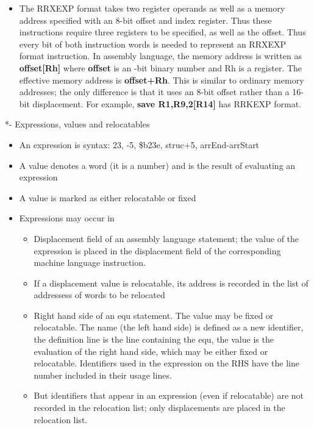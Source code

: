 \documentclass[11pt]{article}
\begin{document}
\begin{itemize}
\item The RRXEXP format takes two register operands as well as a memory
address specified with an 8-bit offset and index register.  Thus
these instructions require three registers to be specified, as well
as the offset.  Thus every bit of both instruction words is needed
to represent an RRXEXP format instruction.  In assembly language,
the memory address is written as \textbf{offset[Rh]} where \textbf{offset} is an
-bit binary number and Rh is a register.  The effective memory
address is \textbf{offset+Rh}. This is similar to ordinary memory
addresses; the only difference is that it uses an 8-bit offset
rather than a 16-bit displacement. For example, \textbf{save R1,R9,2[R14]}
has RRKEXP format.
\end{itemize}

*- Expressions, values and relocatables

\begin{itemize}
\item An expression is syntax: 23, -5, \$b23e, struc+5, arrEnd-arrStart
\item A value denotes a word (it is a number) and is the result of
evaluating an expression
\item A value is marked as either relocatable or fixed
\item Expressions may occur in
\begin{itemize}
\item Displacement field of an assembly language statement; the value of
the expression is placed in the displacement field of the
corresponding machine language instruction.
\item If a displacement value is relocatable, its address is recorded in
the list of addressess of words to be relocated
\item Right hand side of an equ statement.  The value may be fixed or
relocatable.  The name (the left hand side) is defined as a new
identifier, the definition line is the line containing the equ,
the value is the evaluation of the right hand side, which may be
either fixed or relocatable.  Identifiers used in the expression
on the RHS have the line number included in their usage lines.
\item But identifiers that appear in an expression (even if relocatable)
are not recorded in the relocation list; only displacements are
placed in the relocation list.
\end{itemize}
\end{itemize}
\end{document}
